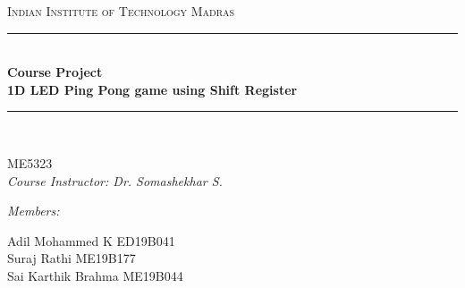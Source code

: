 \documentclass[12pt, a4paper, oneside]{report}
\begin{document}
\begin{titlepage}

    \newcommand{\HRule}{\rule{\linewidth}{0.5mm}} %
    
    \center %
    
    
    
    \textsc{\large Indian Institute of Technology Madras}\\[0.5cm]
    
    \HRule \\[0.8cm]
    { \large \bfseries Course Project}\\[0.4cm]
    { \large \bfseries 1D LED Ping Pong game using Shift Register}\\[0.2cm]
    \HRule \\[1.5cm]
    
    
    \begin{minipage}{0.8\textwidth}
        \begin{center} \large
            {ME5323}\\
            \emph{Course Instructor: Dr. Somashekhar S. }\\
            
            
        \end{center}
        
        
        
    \end{minipage}
    
    \bigskip
    \bigskip
    
    \emph{Members: }\\
    \begin{center} \large
        Adil Mohammed K ED19B041\\
        Suraj Rathi ME19B177 \\
        Sai Karthik Brahma ME19B044\\
        
        
        

\end{center}
\end{titlepage}
\end{document}
